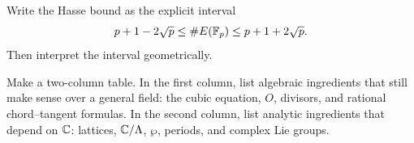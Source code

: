 \begin{exercise}
Write the Hasse bound as the explicit interval
\[
  p+1-2\sqrt p\le \#E(\mathbb{F}_p)\le p+1+2\sqrt p.
\]
Then interpret the interval geometrically.
\end{exercise}

\begin{exercise}
Make a two-column table.  In the first column, list algebraic ingredients that
still make sense over a general field: the cubic equation, \(O\), divisors, and
rational chord--tangent formulas.  In the second column, list analytic
ingredients that depend on \(\mathbb{C}\): lattices, \(\mathbb{C}/\Lambda\), \(\wp\), periods,
and complex Lie groups.
\end{exercise}
